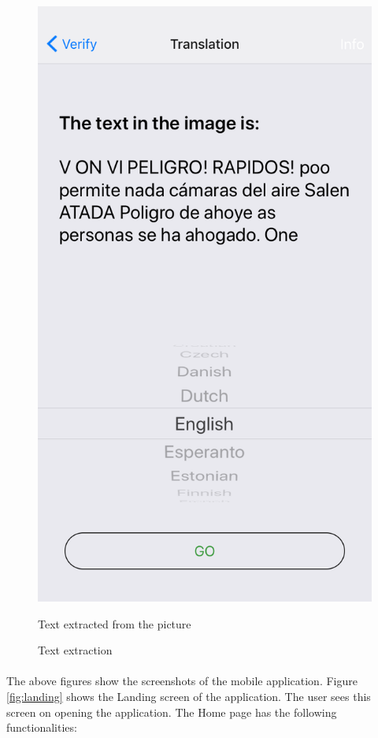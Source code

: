 \documentclass[12pt]{article}
\begin{document}
\begin{figure} [H]
\begin{minipage}{.5\textwidth}
  \includegraphics[width=0.9\linewidth]{media/2.PNG}
  \caption{Text extraction} {Text extracted from the  picture}
  \label{fig:ocr}
\end{minipage}
\end{figure}

\paragraph{}The above figures show the screenshots of the mobile application. Figure \ref{fig:landing} shows the Landing screen of the application. The user sees this screen on opening the application. The Home page has the following functionalities: 
\end{document}

